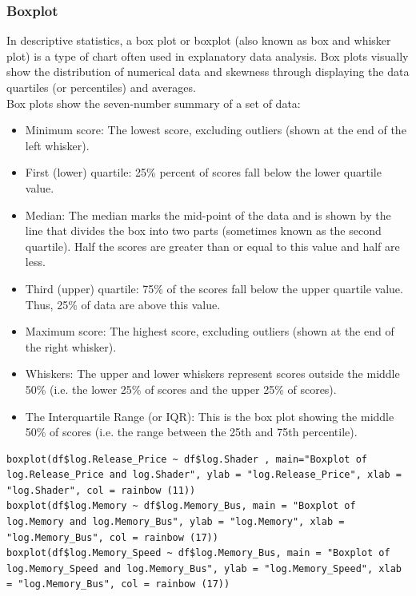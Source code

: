 \documentclass[a4paper]{article}
\begin{document}
\subsubsection{Boxplot}
In descriptive statistics, a box plot or boxplot (also known as box and whisker plot) is a type of chart often used in explanatory data analysis. Box plots visually show the distribution of numerical data and skewness through displaying the data quartiles (or percentiles) and averages.\\
Box plots show the seven-number summary of a set of data: 
\begin{itemize}
    \item Minimum score: The lowest score, excluding outliers (shown at the end of the left whisker).
    \item First (lower) quartile: 25\% percent of scores fall below the lower quartile value.
    \item Median: The median marks the mid-point of the data and is shown by the line that divides the box into two parts (sometimes known as the second quartile). Half the scores are greater than or equal to this value and half are less.
    \item Third (upper) quartile: 75\% of the scores fall below the upper quartile value. Thus, 25\% of data are above this value.
    \item Maximum score: The highest score, excluding outliers (shown at the end of the right whisker).
    \item Whiskers: The upper and lower whiskers represent scores outside the middle 50\% (i.e. the lower 25\% of scores and the upper 25\% of scores).
    \item The Interquartile Range (or IQR): This is the box plot showing the middle 50\% of scores (i.e. the range between the 25th and 75th percentile).
\end{itemize}
\begin{mdframed}[leftline=false,rightline=false,backgroundcolor=lightblue!10,nobreak=false]
    \begin{verbatim}
boxplot(df$log.Release_Price ~ df$log.Shader , main="Boxplot of log.Release_Price and log.Shader", ylab = "log.Release_Price", xlab = "log.Shader", col = rainbow (11))
boxplot(df$log.Memory ~ df$log.Memory_Bus, main = "Boxplot of log.Memory and log.Memory_Bus", ylab = "log.Memory", xlab = "log.Memory_Bus", col = rainbow (17))
boxplot(df$log.Memory_Speed ~ df$log.Memory_Bus, main = "Boxplot of log.Memory_Speed and log.Memory_Bus", ylab = "log.Memory_Speed", xlab = "log.Memory_Bus", col = rainbow (17))
    \end{verbatim}
\end{mdframed}
\end{document}
